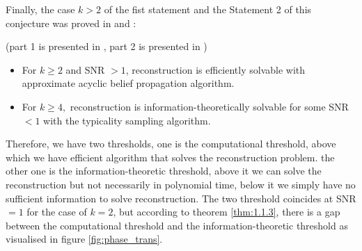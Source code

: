 Finally, the case $k>2$ of the fist statement and the Statement 2 of this conjecture was proved in \cite{As16b} and \cite{as16a}:
\begin{theorem}\label{thm:1.1.3}
(part 1 is presented in \cite{As16b}, part 2 is presented in \cite{as16a})
\begin{itemize}
    \item For $k\geq2$ and SNR $>1$, reconstruction is efficiently solvable with approximate acyclic belief propagation algorithm.
    \item For $k\geq4,$ reconstruction is information-theoretically solvable for some SNR $<1$ with the typicality sampling algorithm.
\end{itemize}
\end{theorem}
\begin{remark}
    Therefore, we have two thresholds, one is the computational threshold, above which we have efficient algorithm that solves the reconstruction problem. the other one is the information-theoretic threshold, above it we can solve the reconstruction but not necessarily in polynomial time, below it we simply have no sufficient information to solve reconstruction. The two threshold coincides at SNR $=1$ for the case of $k=2$, but according to theorem \ref{thm:1.1.3}, there is a gap between the computational threshold and the information-theoretic threshold as visualised in figure \ref{fig:phase_trans}.
\end{remark}
\clearpage
